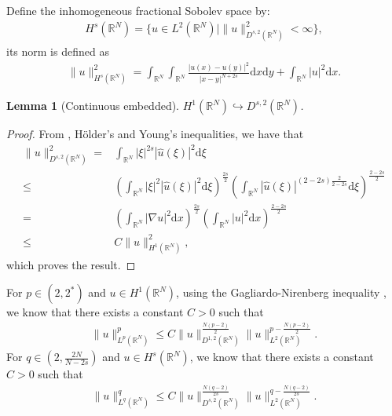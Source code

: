 \documentclass[12pt,a4paper,reqno]{amsart}
\numberwithin{equation}{section}
\newtheorem{lemma}{Lemma}[section]
\begin{document}
Define the inhomogeneous fractional Sobolev space by:
\begin{equation*}
\begin{aligned}
H^{s}(\mathbb{R}^{N})
=
\{u\in L^{2}(\mathbb{R}^{N})|
\|u\|_{D^{s,2}(\mathbb{R}^{N})}^{2}
<\infty\},
\end{aligned}
\end{equation*}
its norm is defined as
\begin{equation*}
\begin{aligned}
\|u\|_{H^{s}(\mathbb{R}^{N})}^{2}
=
\int_{\mathbb{R}^{N}}\int_{\mathbb{R}^{N}}\frac{|u(x)-u(y)|^{2}}{|x-y|^{N+2s}}\mathrm{d}x\mathrm{d}y
+
\int_{\mathbb{R}^{N}}
|u|^{2}
\mathrm{d}x.
\end{aligned}
\end{equation*}



\begin{lemma}[Continuous embedded]\label{Lemma2.1}
$H^{1}(\mathbb{R}^{N})
\hookrightarrow
D^{s,2}(\mathbb{R}^{N})$.
\end{lemma}
\begin{proof}
From \cite{Nezza-Palatucci-Valdinoci2012BSM},
H\"{o}lder's and Young's inequalities,
we have that
\begin{equation*}
\begin{aligned}
\|u\|_{D^{s,2}(\mathbb{R}^{N})}^{2}
=&
\int_{\mathbb{R}^{N}}
|\xi|^{2s}|\hat{u}(\xi)|^{2}
\mathrm{d}\xi\\
\leqslant&
\left(
\int_{\mathbb{R}^{N}}
|\xi|^{2}|\hat{u}(\xi)|^{2}
\mathrm{d}\xi
\right)^{\frac{2s}{2}}
\left(
\int_{\mathbb{R}^{N}}
|\hat{u}(\xi)|^{(2-2s)\frac{2}{2-2s}}
\mathrm{d}\xi
\right)^{\frac{2-2s}{2}}\\
=&
\left(
\int_{\mathbb{R}^{N}}
|\nabla u|^{2}
\mathrm{d}x
\right)^{\frac{2s}{2}}
\left(
\int_{\mathbb{R}^{N}}
|u|^{2}
\mathrm{d}x
\right)^{\frac{2-2s}{2}}\\
\leqslant&C\|u\|_{H^{1}(\mathbb{R}^{N})}^{2},
\end{aligned}
\end{equation*}
which proves the result.
\end{proof}

For $p\in(2,2^{*})$ and $u\in H^{1}(\mathbb{R}^{N})$, using the Gagliardo-Nirenberg inequality \cite{Weinstein1983CMP}, we know that there exists a constant $C>0$ such that
\begin{equation}\label{2.1}
\begin{aligned}
\|u\|_{L^{p}(\mathbb{R}^{N})}^{p}
\leqslant
C
\|u\|_{D^{1,2}(\mathbb{R}^{N})}^{\frac{N(p-2)}{2}}
\|u\|_{L^{2}(\mathbb{R}^{N})}^{p-\frac{N(p-2)}{2}}.
\end{aligned}
\end{equation}
For $q\in(2,\frac{2N}{N-2s})$ and $u\in H^{s}(\mathbb{R}^{N})$, we know that there exists a constant $C>0$ such that
\begin{equation}\label{2.2}
\begin{aligned}
\|u\|_{L^{q}(\mathbb{R}^{N})}^{q}
\leqslant
C
\|u\|_{D^{s,2}(\mathbb{R}^{N})}^{\frac{N(q-2)}{2s}}
\|u\|_{L^{2}(\mathbb{R}^{N})}^{q-\frac{N(q-2)}{2s}}.
\end{aligned}
\end{equation}
\end{document}
